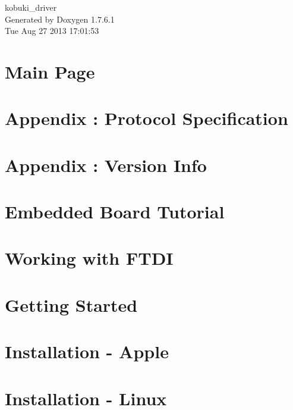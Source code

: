 \documentclass[a4paper]{book}
\begin{document}
\begin{titlepage}
\vspace*{7cm}
\begin{center}
{\Large kobuki\-\_\-driver }\\
\vspace*{1cm}
{\large \-Generated by Doxygen 1.7.6.1}\\
\vspace*{0.5cm}
{\small Tue Aug 27 2013 17:01:53}\\
\end{center}
\end{titlepage}
\clearemptydoublepage
{}
\tableofcontents
\clearemptydoublepage
{}
\chapter{\-Main \-Page}
\label{index}
\chapter{\-Appendix \-: \-Protocol \-Specification}
\label{enAppendixProtocolSpecification}

\chapter{\-Appendix \-: \-Version \-Info}
\label{enAppendixVersionInfo}

\chapter{\-Embedded \-Board \-Tutorial}
\label{enEmbeddedBoardTutorial}

\chapter{\-Working with \-F\-T\-D\-I}
\label{enFtdiGuide}

\chapter{\-Getting \-Started}
\label{enGettingStartedGuide}

\chapter{\-Installation -\/ \-Apple}
\label{koInstallationAppleGuide}

\chapter{\-Installation -\/ \-Linux}
\label{enInstallationLinuxGuide}

\end{document}
